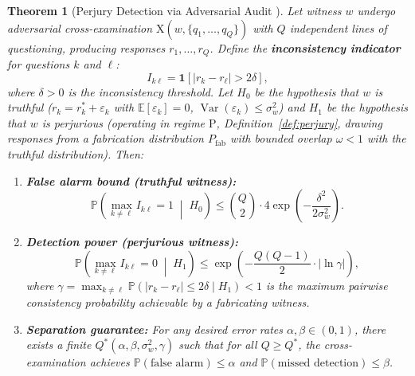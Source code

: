 \documentclass[11pt,a4paper]{article}
\newtheorem{theorem}{Theorem}[section]
\theoremstyle{definition}
\DeclareMathOperator{\Var}{Var}
\newcommand{\E}{\mathbb{E}}
\newcommand{\Pbb}{\mathbb{P}}
\newcommand{\ind}[1]{\mathbf{1}[#1]}
\newcommand{\abs}[1]{\left|#1\right|}
\newcommand{\crossexam}{\mathrm{X}}             %
\newcommand{\perjury}{\mathrm{P}}               %
\begin{document}
\begin{theorem}[Perjury Detection via Adversarial Audit ]
\label{thm:perjury}
Let witness $w$ undergo adversarial cross-examination $\crossexam(w, \{q_1, \ldots, q_Q\})$ with $Q$ independent lines of questioning, producing responses $r_1, \ldots, r_Q$. Define the \textbf{inconsistency indicator} for questions $k$ and $\ell$:
\begin{equation}
    I_{k\ell} = \ind{\abs{r_k - r_\ell} > 2\delta},
    \label{eq:inconsistency_perjury}
\end{equation}
where $\delta > 0$ is the inconsistency threshold. Let $H_0$ be the hypothesis that $w$ is truthful ($r_k = r_k^* + \varepsilon_k$ with $\E[\varepsilon_k] = 0$, $\Var(\varepsilon_k) \leq \sigma_w^2$) and $H_1$ be the hypothesis that $w$ is perjurious (operating in regime $\perjury$, Definition~\ref{def:perjury}, drawing responses from a fabrication distribution $P_{\mathrm{fab}}$ with bounded overlap $\omega < 1$ with the truthful distribution). Then:

\begin{enumerate}[label=(\roman*)]
    \item \textbf{False alarm bound (truthful witness):}
    \begin{equation}
        \Pbb\left(\max_{k \neq \ell} I_{k\ell} = 1 \;\middle|\; H_0\right) \leq \binom{Q}{2} \cdot 4\exp\left(-\frac{\delta^2}{2\sigma_w^2}\right).
        \label{eq:false_alarm}
    \end{equation}

    \item \textbf{Detection power (perjurious witness):}
    \begin{equation}
        \Pbb\left(\max_{k \neq \ell} I_{k\ell} = 0 \;\middle|\; H_1\right) \leq \exp\left(-\frac{Q(Q-1)}{2} \cdot \abs{\ln \gamma}\right),
        \label{eq:detection_power}
    \end{equation}
    where $\gamma = \max_{k \neq \ell} \Pbb(\abs{r_k - r_\ell} \leq 2\delta \mid H_1) < 1$ is the maximum pairwise consistency probability achievable by a fabricating witness.

    \item \textbf{Separation guarantee:} For any desired error rates $\alpha, \beta \in (0, 1)$, there exists a finite $Q^*(\alpha, \beta, \sigma_w^2, \gamma)$ such that for all $Q \geq Q^*$, the cross-examination achieves $\Pbb(\text{false alarm}) \leq \alpha$ and $\Pbb(\text{missed detection}) \leq \beta$.
\end{enumerate}
\end{theorem}
\end{document}
